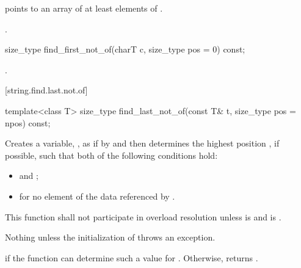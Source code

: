 \begin{itemdescr}
\pnum
\requires {} points to an array of at least 
elements of .

\pnum
\returns
{}.
\end{itemdescr}

%
\begin{itemdecl}
size_type find_first_not_of(charT c, size_type pos = 0) const;
\end{itemdecl}

\begin{itemdescr}
\pnum
\returns
{}.
\end{itemdescr}

[string.find.last.not.of]{}

%
\begin{itemdecl}
template<class T>
  size_type find_last_not_of(const T& t, size_type pos = npos) const;
\end{itemdecl}

\begin{itemdescr}
\pnum
\effects
Creates a variable, , as if by
 and then
determines the highest position , if possible, such that both of
the following conditions hold:
\begin{itemize}
\item
{}
and
;
\item
{}%
for no element  of the data referenced by .
\end{itemize}

\pnum
\remarks
This function shall not participate in overload resolution unless
 is  and
 is .

\pnum
\throws
Nothing unless the initialization of  throws an exception.

\pnum
\returns
{} if the function can determine such a value for .
Otherwise, returns
.
\end{itemdescr}

